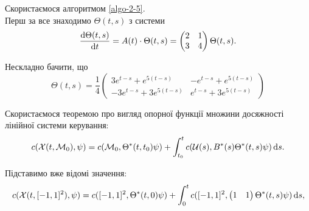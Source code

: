 \begin{solution}
	Скористаємося алгоритмом \ref{algo-2-5}. \\

	Перш за все знаходимо $\Theta(t,s)$ з системи \[ \frac{\mathop{}\!\mathrm{d} \Theta(t, s)}{\mathop{}\!\mathrm{d} t} = A(t) \cdot \Theta(t, s) = \begin{pmatrix} 2 & 1 \\ 3 & 4 \end{pmatrix} \Theta(t, s). \]

	Нескладно бачити, що \[ \Theta(t, s) = \frac{1}{4}
	\begin{pmatrix}
		3 e^{t - s} + e^{5 (t - s)} & - e^{t - s} + e^{5 (t - s)} \\ -3 e^{t - s} + 3 e^{5 (t - s)} & e^{t - s} + 3 e^{5 (t - s)}
	\end{pmatrix} 
	\]

	Скористаємося теоремою про вигляд опорної функції множини досяжності лінійної системи керування: \[ c(\mathcal{X}(t, \mathcal{M}_0), \psi) = c(\mathcal{M}_0, \Theta^*(t, t_0) \psi) + \int_{t_0}^t c(\mathcal{U}(s), B^*(s) \Theta^*(t, s) \psi) \mathop{}\!\mathrm{d} s. \]

	Підставимо вже відомі значення: \[ c(\mathcal{X}(t, [-1,1]^2), \psi) = c([-1,1]^2, \Theta^*(t, 0) \psi) + \int_0^t c([-1,1]^2, \begin{pmatrix} 1 & 1 \end{pmatrix} \Theta^*(t, s) \psi) \mathop{}\!\mathrm{d} s, \] 


\end{solution}
